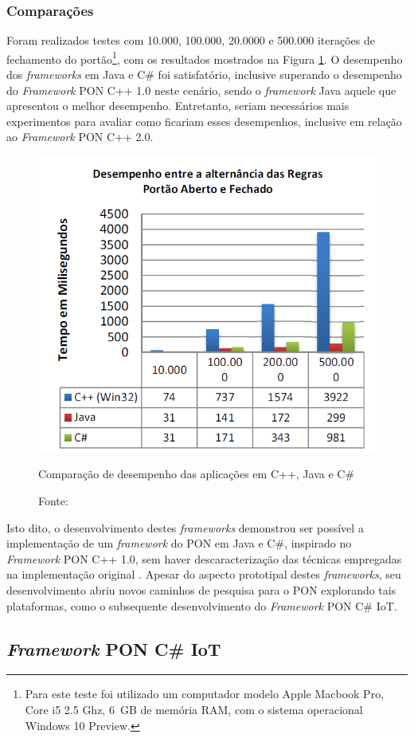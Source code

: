 \subsubsection{Comparações}

Foram realizados testes com 10.000, 100.000, 20.0000 e 500.000 iterações de
fechamento do portão\footnote{Para este teste foi utilizado um computador modelo
Apple Macbook Pro, Core i5 2.5 Ghz, 6 GB de memória RAM, com o sistema
operacional Windows 10 Preview.}, com os resultados mostrados na Figura
\ref{fig:comp_henzen}. O desempenho dos \textit{frameworks} em Java e C\# foi
satisfatório, inclusive superando o desempenho do \textit{Framework} PON C++ 1.0
neste cenário, sendo o \textit{framework} Java aquele que apresentou o melhor
desempenho. Entretanto, seriam necessários mais experimentos para avaliar como
ficariam esses desempenhos, inclusive em relação ao \textit{Framework} PON C++
2.0.

\begin{figure}[!htb]
  \centering
  \includegraphics[width=.5\textwidth]{../figures/comp_henzen.png}
  \caption{Comparação de desempenho das aplicações em C++, Java e C\#}
  \caption*{Fonte: }
  \label{fig:comp_henzen}
\end{figure}

Isto dito, o desenvolvimento destes \textit{frameworks} demonstrou ser possível
a implementação de um \textit{framework} do PON em Java e C\#, inspirado no
\textit{Framework} PON C++ 1.0, sem haver descaracterização das técnicas
empregadas na implementação original \cite{henzen_2015}. Apesar do aspecto
prototipal destes \textit{frameworks}, seu desenvolvimento abriu novos caminhos
de pesquisa para o PON explorando tais plataformas, como o subsequente
desenvolvimento do \textit{Framework} PON C\# IoT.

\FloatBarrier

\subsection{\textit{Framework} PON C\# IoT}

